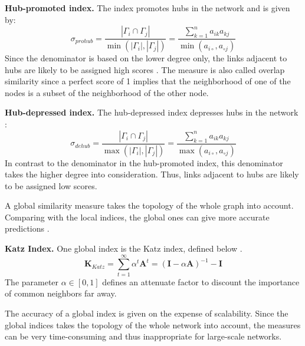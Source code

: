 \textbf{Hub-promoted index.} The index promotes hubs in the network and is given by: 
\begin{equation}
    \label{prohub}
    \sigma_{prohub} = \frac{|\Gamma_i \cap \Gamma_j|}{\min(|\Gamma_i|,|\Gamma_j|)} = \frac{\sum_{k=1}^n a_{ik}a_{kj}}{\min(a_{i \circ },a_{\circ j})}
\end{equation}
Since the denominator is based on the lower degree only, the links adjacent to hubs are likely to be assigned high scores \citep{lu2011}. The measure is also called overlap similarity \citep{fouss2016algorithms} since a perfect score of 1 implies that the neighborhood of one of the nodes is a subset of the neighborhood of the other node.

\textbf{Hub-depressed index.} The hub-depressed index depresses hubs in the network \citep{fouss2016algorithms}:
\begin{equation}
    \label{dehub}
    \sigma_{dehub} = \frac{|\Gamma_i \cap \Gamma_j|}{\max(|\Gamma_i|,|\Gamma_j|)} = \frac{\sum_{k=1}^n a_{ik}a_{kj}}{\max(a_{i \circ },a_{\circ j})}
\end{equation}
In contrast to the denominator in the hub-promoted index, this denominator takes the higher degree into consideration. Thus, links adjacent to hubs are likely to be assigned low scores. 

\begin{comment}
\textbf{Adamic index.} 
\begin{equation}
    \label{adamic}
    \sigma_{Adamic} = \frac{|\Gamma_i \cap \Gamma_j|}{\log(|\Gamma_i|,|\Gamma_j|)} = \frac{\sum_{k=1}^n a_{ik}a_{kj}}{\max(a_{i \circ },a_{\circ j})}
\end{equation}
\end{comment}

A global similarity measure takes the topology of the whole graph into account. Comparing with the local indices, the global ones can give more accurate predictions \citep{lu2011}.

\textbf{Katz Index.} One global index is the Katz index, defined below \citep{fouss2016algorithms}.
\begin{equation}
    \textbf{K}_{Katz}=\sum_{t=1}^{\infty} \alpha^t \textbf{A}^t = (\textbf{I}-\alpha \textbf{A})^{-1}-\textbf{I}
\end{equation}
The parameter $\alpha \in [0,1]$ defines an attenuate factor to discount the importance of common neighbors far away. 

The accuracy of a global index is given on the expense of scalability. Since the global indices takes the topology of the whole network into account, the measures can be very time-consuming and thus inappropriate for large-scale networks. 


